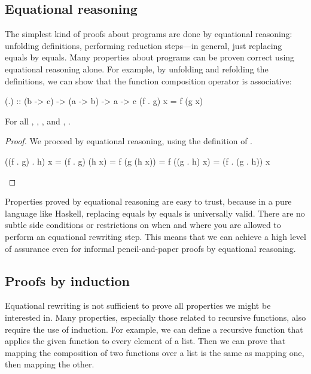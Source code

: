 \subsection{Equational reasoning}

The simplest kind of proofs about programs are done by equational reasoning: unfolding definitions, performing reduction steps---in general, just replacing equals by equals. Many properties about programs can be proven correct using equational reasoning alone. For example, by unfolding and refolding the definitions, we can show that the function composition operator  is associative:

\begin{hscode}
(.) :: (b -> c) -> (a -> b) -> a -> c
(f . g) x = f (g x)
\end{hscode}

\begin{theorem}
For all , , , and , .
\end{theorem}

\begin{proof}
We proceed by equational reasoning, using the definition of .

\medskip
\begin{minipage}[b]{0.4\textwidth}
\begin{hscode}
((f . g) . h) x
  = (f . g) (h x)
  = f (g (h x))
  = f ((g . h) x)
  = (f . (g . h)) x
\end{hscode}
\end{minipage}
\hfill
\qedhere
\end{proof}

Properties proved by equational reasoning are easy to trust, because in a pure language like Haskell, replacing equals by equals is universally valid. There are no subtle side conditions or restrictions on when and where you are allowed to perform an equational rewriting step. This means that we can achieve a high level of assurance even for informal pencil-and-paper proofs by equational reasoning.

\subsection{Proofs by induction}

Equational rewriting is not sufficient to prove all properties we might be interested in. Many properties, especially those related to recursive functions, also require the use of induction. For example, we can define a recursive function  that applies the given function  to every element of a list. Then we can prove that mapping the composition of two functions over a list is the same as mapping one, then mapping the other.


